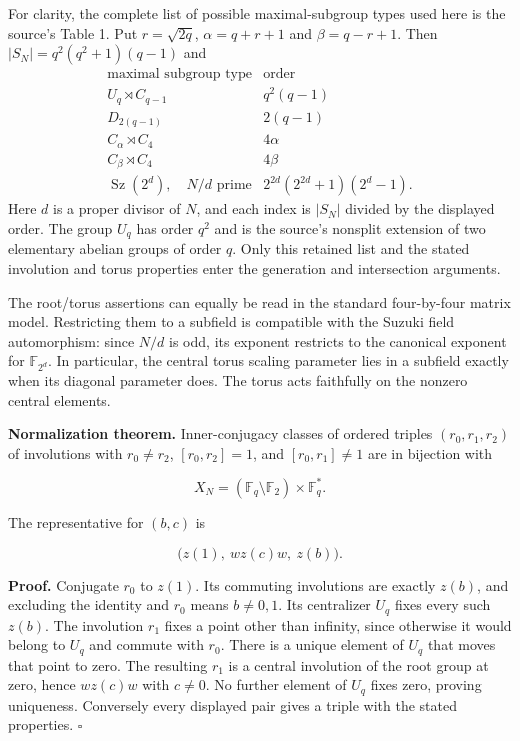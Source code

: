 For clarity, the complete list of possible maximal-subgroup types used
here is the source's Table 1. Put $r=\sqrt{2q}$,
$\alpha=q+r+1$ and $\beta=q-r+1$. Then $|S_N|=q^2(q^2+1)(q-1)$ and
\[
\begin{array}{c|c}
\text{maximal subgroup type}&\text{order}\\\hline
 U_q\rtimes C_{q-1}&q^2(q-1)\\
 D_{2(q-1)}&2(q-1)\\
 C_{\alpha}\rtimes C_4&4\alpha\\
 C_{\beta}\rtimes C_4&4\beta\\
 \operatorname{Sz}(2^d),\quad N/d\text{ prime}&2^{2d}(2^{2d}+1)(2^d-1).
\end{array}
\]
Here $d$ is a proper divisor of $N$, and each index is $|S_N|$ divided
by the displayed order. The group $U_q$ has order $q^2$ and is the
source's nonsplit extension of two elementary abelian groups of order
$q$. Only this retained list and the stated involution and torus
properties enter the generation and intersection arguments.

The root/torus assertions can equally be read in the standard
four-by-four matrix model. Restricting them to a subfield is compatible
with the Suzuki field automorphism: since \(N/d\) is odd, its exponent
restricts to the canonical exponent for \(\mathbb F_{2^d}\). In
particular, the central torus scaling parameter lies in a subfield
exactly when its diagonal parameter does. The torus acts faithfully on
the nonzero central elements.

\textbf{Normalization theorem.} Inner-conjugacy classes of ordered
triples \((r_0,r_1,r_2)\) of involutions with \(r_0\ne r_2\),
\([r_0,r_2]=1\), and \([r_0,r_1]\ne1\) are in bijection with

\[X_N=(\mathbb F_q\setminus\mathbb F_2)\times\mathbb F_q^*.\]

The representative for \((b,c)\) is

\[\bigl(z(1),\ wz(c)w,\ z(b)\bigr).\]

\textbf{Proof.} Conjugate \(r_0\) to \(z(1)\). Its commuting involutions
are exactly \(z(b)\), and excluding the identity and \(r_0\) means
\(b\ne0,1\). Its centralizer \(U_q\) fixes every such \(z(b)\). The
involution \(r_1\) fixes a point other than infinity, since otherwise it
would belong to \(U_q\) and commute with \(r_0\). There is a unique
element of \(U_q\) that moves that point to zero. The resulting \(r_1\)
is a central involution of the root group at zero, hence \(wz(c)w\) with
\(c\ne0\). No further element of \(U_q\) fixes zero, proving uniqueness.
Conversely every displayed pair gives a triple with the stated
properties. \(\square\)

